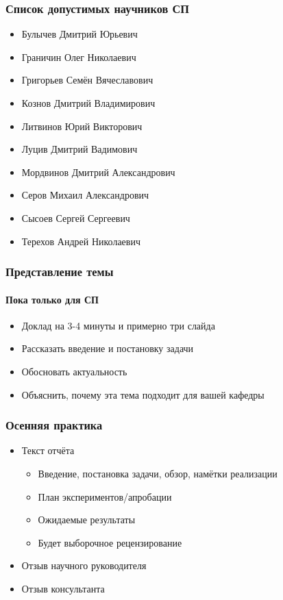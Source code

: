 \documentclass{../../slides-style}
\begin{document}
    \begin{frame}
        \frametitle{Список допустимых научников СП}
        \begin{itemize}
            \item Булычев Дмитрий Юрьевич
            \item Граничин Олег Николаевич
            \item Григорьев Семён Вячеславович
            \item Кознов Дмитрий Владимирович
            \item Литвинов Юрий Викторович
            \item Луцив Дмитрий Вадимович
            \item Мордвинов Дмитрий Александрович
            \item Серов Михаил Александрович
            \item Сысоев Сергей Сергеевич
            \item Терехов Андрей Николаевич
        \end{itemize}
    \end{frame}

    \begin{frame}
        \frametitle{Представление темы}
        \framesubtitle{Пока только для СП}
        \begin{itemize}
            \item Доклад на 3-4 минуты и примерно три слайда
            \item Рассказать введение и постановку задачи
            \item Обосновать актуальность
            \item Объяснить, почему эта тема подходит для вашей кафедры
        \end{itemize}
    \end{frame}

    \begin{frame}
        \frametitle{Осенняя практика}
        \begin{itemize}
            \item Текст отчёта
            \begin{itemize}
                \item Введение, постановка задачи, обзор, намётки реализации
                \item План экспериментов/апробации
                \item Ожидаемые результаты
                \item Будет выборочное рецензирование
            \end{itemize} 
            \item Отзыв научного руководителя
            \item Отзыв консультанта
        \end{itemize}
    \end{frame}
\end{document}
